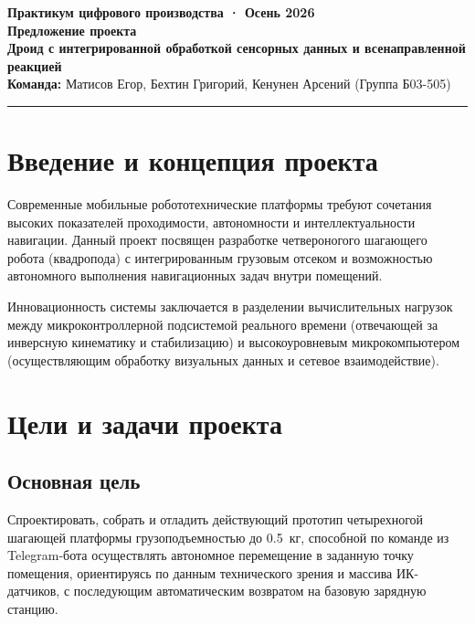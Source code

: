 \documentclass[11pt, a4paper]{article}
\begin{document}
\begin{center}
    {\large \textbf{Практикум цифрового производства · Осень 2026}} \\[0.5em]
    {\LARGE \textbf{\color{primary} Предложение проекта}} \\[0.5em]
    {\huge \textbf{Дроид с интегрированной обработкой сенсорных данных и всенаправленной реакцией}} \\[1em]
    \textbf{Команда:} Матисов Егор, Бехтин Григорий, Кенунен Арсений (Группа Б03-505)
\end{center}

\vspace{0.5em}
\hrule
\vspace{1.5em}

\section{Введение и концепция проекта}
Современные мобильные робототехнические платформы требуют сочетания высоких показателей проходимости, автономности и интеллектуальности навигации. Данный проект посвящен разработке четвероногого шагающего робота (квадропода) с интегрированным грузовым отсеком и возможностью автономного выполнения навигационных задач внутри помещений.

Инновационность системы заключается в разделении вычислительных нагрузок между микроконтроллерной подсистемой реального времени (отвечающей за инверсную кинематику и стабилизацию) и высокоуровневым микрокомпьютером (осуществляющим обработку визуальных данных и сетевое взаимодействие).

\section{Цели и задачи проекта}

\subsection{Основная цель}
Спроектировать, собрать и отладить действующий прототип четырехногой шагающей платформы грузоподъемностью до 0.5~кг, способной по команде из Telegram-бота осуществлять автономное перемещение в заданную точку помещения, ориентируясь по данным технического зрения и массива ИК-датчиков, с последующим автоматическим возвратом на базовую зарядную станцию.
\end{document}
